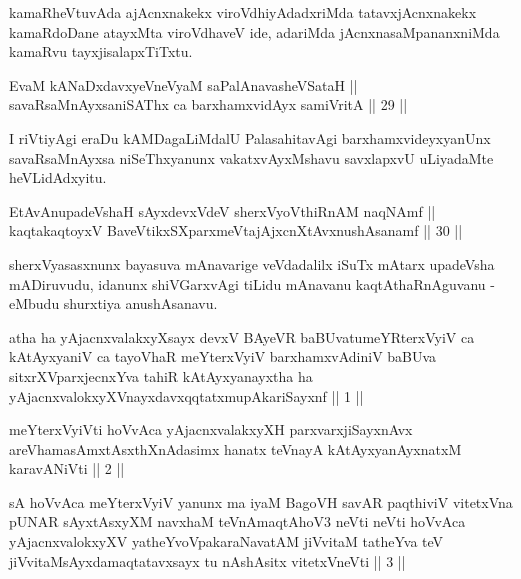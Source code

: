 \begin{artha}
kamaRheVtuvAda ajAcnxnakekx viroVdhiyAdadxriMda tatavxjAcnxnakekx kamaRdoDane atayxMta viroVdhaveV ide, adariMda jAcnxnasaMpananxniMda kamaRvu tayxjisalapxTiTxtu.
\end{artha}

\begin{shl}
EvaM kANaDxdavxyeVneVyaM saPalA\s navasheVSataH || \\
savaRsaMnAyxsaniSAThx ca barxhamxvidAyx samiVritA \hfill || 29 ||  
\end{shl}

\begin{artha}
I riVtiyAgi eraDu kAMDagaLiMdalU PalasahitavAgi barxhamxvideyxyanUnx savaRsaMnAyxsa niSeThxyanunx vakatxvAyxMshavu savxlapxvU uLiyadaMte heVLidAdxyitu.
\end{artha}

\begin{shl}
EtAvAnupadeVshaH sAyxdevxVdeV sherxVyoVthiRnAM naqNAmf || \\
kaqtakaqtoyxV BaveVtikxSXparxmeVtajAjxcnXtAvx\s nushAsanamf \hfill || 30 ||  
\end{shl}

\begin{artha}
sherxVyasasxnunx bayasuva mAnavarige veVdadalilx iSuTx mAtarx upadeVsha mADiruvudu, idanunx shiVGarxvAgi tiLidu mAnavanu kaqtAthaRnAguvanu - eMbudu shurxtiya anushAsanavu.
\end{artha}


\begin{kandikeshl}
atha ha yAjacnxvalakxyXsayx devxV BAyeVR baBUvatumeYRterxVyiV ca kAtAyxyaniV ca tayoVhaR meYterxVyiV barxhamxvAdiniV baBUva sitxrXVparxjecnxYva tahiR kAtAyxyanayxtha ha yAjacnxvalokxyXV\s nayxdavxqqtatxmupAkariSayxnf || 1 ||
\end{kandikeshl}

\begin{kandikeshl}
meYterxVyiVti hoVvAca yAjacnxvalakxyXH parxvarxjiSayxnAvx areV\s hama\-\break sAmxtAsxthXnAdasimx hanatx teV\s nayA kAtAyxyanAyxnatxM karavANiVti || 2 ||
\end{kandikeshl}

\begin{kandikeshl}
sA hoVvAca meYterxVyiV yanunx ma iyaM BagoVH savAR paqthiviV vitetxVna pUNAR sAyxtAsxyXM navxhaM teVnAmaqtAhoV3 neVti neVti hoVvAca yAjacnxvalokxyXV yatheYvoVpakaraNavatAM jiVvitaM tatheYva teV jiVvitaM\break sAyxdamaqtatavxsayx tu nAshAsitx vitetxVneVti || 3 ||
\end{kandikeshl}


